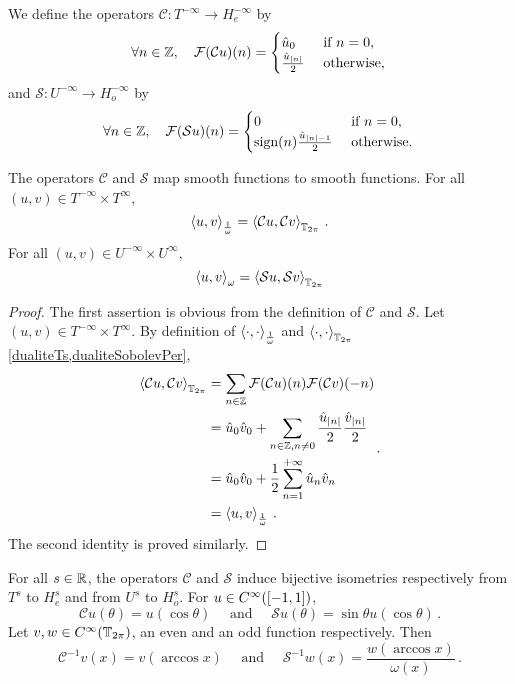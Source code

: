 \documentclass[a4paper]{article}
\begin{document}
\begin{Def}
	We define the operators $\mathcal{C} : T^{-\infty} \to H^{-\infty}_e$ by 
	\[\forall n \in \mathbb{Z}, \quad \mathcal{F}(\mathcal{C}u)(n) = \begin{cases}
	\hat{u}_0 & \text{ if } n = 0,\\
	\frac{\hat{u}_{\left\lvert n \right\rvert}}{2} & \text{ otherwise,}	\end{cases}\,\]
	and $\mathcal{S} : U^{-\infty} \to H^{-\infty}_o$ by 
	\[\forall n \in \mathbb{Z}, \quad \mathcal{F}(\mathcal{S}u)(n) = \begin{cases}
	0 & \text{ if } n = 0,\\
	\textup{sign}(n)\frac{\hat{u}_{\left\lvert n \right\rvert-1}}{2} & \text{ otherwise.}	\end{cases}\,\]
\end{Def}
\begin{Lem}
	\label{FormuleDualitesCetS}
	The operators $\mathcal{C}$ and $\mathcal{S}$ map smooth functions to smooth functions. For all $(u,v) \in T^{-\infty} \times T^{\infty}$, 
	\[\left\langle u,v\right\rangle_{\frac{1}{\omega}} = \left\langle \mathcal{C}u,\mathcal{C}v\right\rangle_{\mathbb{T}_{2\pi}}\,.\]
	For all $(u,v) \in U^{-\infty} \times U^{\infty}$,
	\[\left\langle u,v\right\rangle_{{\omega}} = \left\langle \mathcal{S}u,\mathcal{S}v\right\rangle_{\mathbb{T}_{2\pi}}\]
\end{Lem}
\begin{proof}
	The first assertion is obvious from the definition of $\mathcal{C}$ and $\mathcal{S}$. Let $(u,v) \in T^{-\infty}\times T^{\infty}$. By definition of $\left\langle \cdot,\cdot\right\rangle_\frac{1}{\omega}$  and $\left\langle \cdot,\cdot\right\rangle_{\mathbb{T}_{2\pi}}$ \cref{dualiteTs,dualiteSobolevPer},
	\[\begin{split}
	\left\langle \mathcal{C}u,\mathcal{C}v\right\rangle_{\mathbb{T}_{2\pi}}&= \sum_{n \in \mathbb{Z}}\mathcal{F}(\mathcal{C}u)(n)\mathcal{F}(\mathcal{C}v)(-n)\\ 
	&= \hat{u}_0 \hat{v}_0 + \sum_{n \in \mathbb{Z}, n \neq 0} \frac{\hat{u}_{\left\lvert n \right\rvert}}{2}\frac{\hat{v}_{\left\lvert n \right\rvert}}{2}\\
	&= \hat{u}_0 \hat{v}_0 + \frac{1}{2}\sum_{n = 1}^{+ \infty} \hat{u}_{n} \hat{v}_{n} \\
	&= \left\langle u,v\right\rangle_\frac{1}{\omega}\,.
	\end{split}\,. \]
	The second identity is proved similarly.
\end{proof}
\begin{Lem}
	\label{lemChar}
	For all $s \in \mathbb{R}$, the operators $\mathcal{C}$ and $\mathcal{S}$ induce bijective isometries respectively from $T^s$ to $H^s_e$ and from $U^s$ to $H^s_o$. For $u \in C^{\infty}([-1,1])$, 
	\[\mathcal{C}u(\theta) = u(\cos\theta)
	\quad \text{ and } \quad \mathcal{S}u(\theta) = \sin\theta u(\cos\theta)\,.\]
	Let $v,w \in C^{\infty}(\mathbb{T}_{2\pi})$, an even and an odd function respectively. Then
	\[\mathcal{C}^{-1}v(x) = v(\arccos x) \quad \text{ and } \quad \mathcal{S}^{-1}w(x) = \frac{w(\arccos x)}{\omega(x)}\,.\]
\end{Lem}
\end{document}
